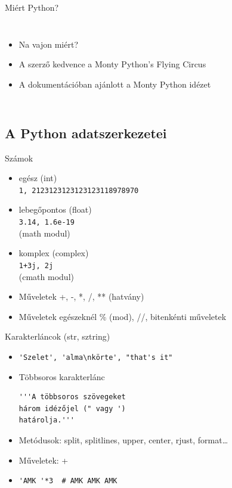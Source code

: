 \begin{frame}
  {Miért Python?}
  \begin{columns}[t, onlytextwidth]
  \begin{itemize}
    \item <1-| alert@1> Na vajon miért?
    \item <2-| alert@2> A szerző kedvence a Monty Python's Flying Circus
    \item <3-| alert@3> A dokumentációban ajánlott a Monty Python idézet
  \end{itemize}
  \end{columns}
\end{frame}

\subsection[Adatszerkezetek]{A Python adatszerkezetei}
\begin{frame}[fragile]
  {Számok }
  \begin{itemize}
    \item <+-| alert@+> egész (int)
\\\verb!1, 2123123123123123118978970!
    \item <+-| alert@+> lebegőpontos (float)
\\\verb!3.14, 1.6e-19!\\ (math modul)
    \item <+-| alert@+> komplex (complex)
\\\verb!1+3j, 2j!\\ (cmath modul)
    \item <+-| alert@+> Műveletek +, -, *, /, ** (hatvány)
    \item <+-| alert@+> Műveletek egészeknél \% (mod), //,
        bitenkénti műveletek\\
  \end{itemize}
\end{frame}

\begin{frame}[fragile]
  {Karakterláncok (str, sztring)}
  \begin{itemize}
    \item <+-| alert@+> \verb!'Szelet', 'alma\nkörte', "that's it"!
    \item <+-| alert@+> Többsoros karakterlánc
\begin{Verbatim}[frame=single]
'''A többsoros szövegeket
három idézőjel (" vagy ')
határolja.'''
\end{Verbatim}
    \item <+-| alert@+> Metódusok: split, splitlines, upper, center,
        rjust, format\dots
    \item <+-| alert@+>  Műveletek: +
    \item <+-| alert@+>  \verb!'AMK '*3  # AMK AMK AMK!
  \end{itemize}
\end{frame}

